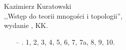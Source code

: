 \documentclass[a4paper,11pt]{article}
\newcommand{\cm}{\checkmark}
\begin{document}
\begin{center}
Kazimierz Kuratowski\\
,,Wstęp do teorii mnogości i topologii'',\\ wydanie , KK.
\end{center}
\begin{itemize}
\item[--] . 1\cm, 2\cm, 3\cm, 4\cm, 5, 6\cm, 7\cm, 7a\cm, 8\cm, 9\cm, 10\cm.
\end{itemize}
\end{document}
